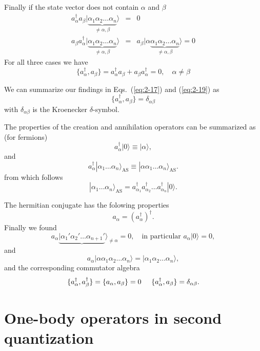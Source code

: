 Finally if the state vector does not contain $\alpha$ and $\beta$
\begin{align}
	a_\alpha^{\dagger} a_\beta |\underbrace{\alpha_1\alpha_2 \dots \alpha_{n}}_{\neq \alpha,\beta}\rangle &=& 0 \nonumber \\
	a_\beta a_\alpha^{\dagger} |\underbrace{\alpha_1\alpha_2 \dots \alpha_{n}}_{\neq \alpha,\beta}\rangle &=& 
		a_\beta |\alpha \underbrace{\alpha_1\alpha_2 \dots \alpha_{n}}_{\neq \alpha,\beta}\rangle = 0 \label{eq:2-18c}
\end{align}
For all three cases we have
\begin{equation}
	\{a_\alpha^{\dagger},a_\beta \} = a_\alpha^{\dagger} a_\beta + a_\beta a_\alpha^{\dagger} = 0, \quad \alpha \neq \beta \label{eq:2-19}
\end{equation}

We can summarize  our findings in Eqs.~(\ref{eq:2-17}) and (\ref{eq:2-19}) as 
\begin{equation}
	\{a_\alpha^{\dagger},a_\beta \} = \delta_{\alpha\beta} \label{eq:2-20}
\end{equation}
with  $\delta_{\alpha\beta}$ is the Kroenecker $\delta$-symbol.

The properties of the creation and annihilation operators can be summarized as (for fermions)
\[
	a_\alpha^{\dagger}|0\rangle \equiv  |\alpha\rangle,
\]
and
\[
	a_\alpha^{\dagger}|\alpha_1\dots \alpha_n\rangle_{\mathrm{AS}} \equiv  |\alpha\alpha_1\dots \alpha_n\rangle_{\mathrm{AS}}. 
\]
from which follows
\[
        |\alpha_1\dots \alpha_n\rangle_{\mathrm{AS}} = a_{\alpha_1}^{\dagger} a_{\alpha_2}^{\dagger} \dots a_{\alpha_n}^{\dagger} |0\rangle.
\]

The hermitian conjugate has the folowing properties
\[
        a_{\alpha} = ( a_{\alpha}^{\dagger} )^{\dagger}.
\]
Finally we found 
\[
	a_\alpha\underbrace{|\alpha_1'\alpha_2' \dots \alpha_{n+1}'}\rangle_{\neq \alpha} = 0, \quad
		\textrm{in particular } a_\alpha |0\rangle = 0,
\]
and
\[
 a_\alpha |\alpha\alpha_1\alpha_2 \dots \alpha_{n}\rangle = |\alpha_1\alpha_2 \dots \alpha_{n}\rangle,
\]
and the corresponding commutator algebra
\[
	\{a_{\alpha}^{\dagger},a_{\beta}^{\dagger}\} = \{a_{\alpha},a_{\beta}\} = 0 \hspace{0.5cm} 
\{a_\alpha^{\dagger},a_\beta \} = \delta_{\alpha\beta}.
\]

\section{One-body operators in second quantization}

